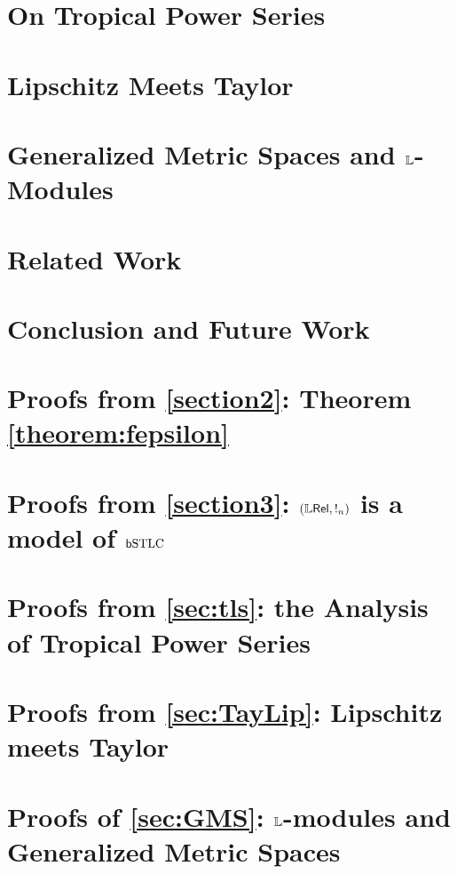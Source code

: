 \documentclass[english]{article}
\begin{document}
\section{On Tropical Power Series}\label{sec:tls}



\section{Lipschitz Meets Taylor}\label{sec:TayLip}


\section{Generalized Metric Spaces and $\mathbb{L}$-Modules}\label{sec:GMS}





\section{Related Work}\label{section7} 


\section{Conclusion and Future Work}\label{section8} 





\appendix

\section{Proofs from \autoref{section2}: Theorem \ref{theorem:fepsilon}}


\section{Proofs from \autoref{section3}: $(\mathbb{L} \mathsf{Rel}, !_{n})$ is a model of $\mathsf b\mathrm{STLC}$}



\section{Proofs from \autoref{sec:tls}: the Analysis of Tropical Power Series}\label{appsec:tls}


\section{Proofs from \autoref{sec:TayLip}: Lipschitz meets Taylor}



\section{Proofs of \autoref{sec:GMS}: $\mathbb{L}$-modules and Generalized Metric Spaces}

\end{document}
